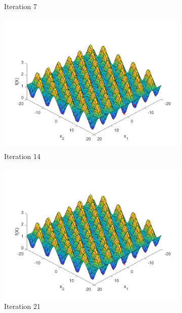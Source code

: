 \begin{figure}
\begin{subfigure}[b]{0.4\textwidth}
   \caption{Iteration 7}
   \label{fig:s7-iter-1}
 \end{subfigure}
 \begin{subfigure}[b]{0.4\textwidth}
   \includegraphics[width=\textwidth]{img/smpl/grwnk2d/loa-iter-14}
   \caption{Iteration 14}
   \label{fig:s7-iter-2}
 \end{subfigure}
 \begin{subfigure}[b]{0.4\textwidth}
   \includegraphics[width=\textwidth]{img/smpl/grwnk2d/loa-iter-21}
   \caption{Iteration 21}
   \label{fig:s7-iter-3}
 \end{subfigure}
 \begin{subfigure}[b]{0.4\textwidth}

\end{subfigure}
\end{figure}
